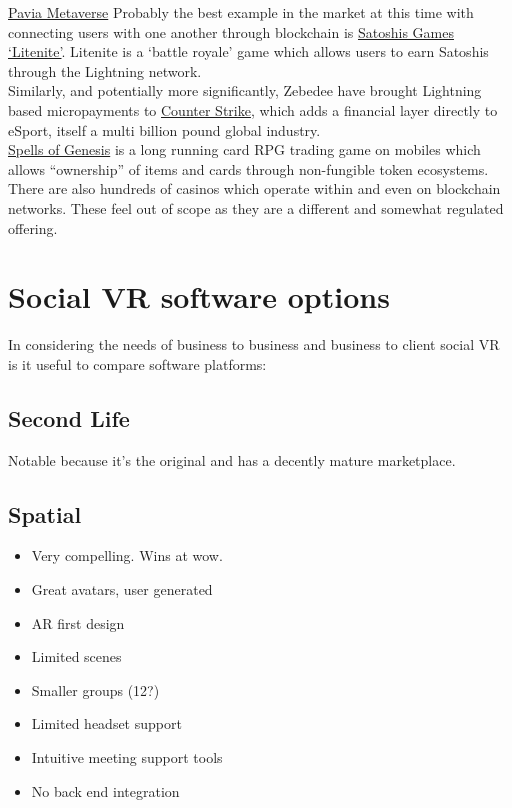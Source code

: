 \href{https://www.thesun.co.uk/tech/17348918/pavia-metaverse-cardano-crypto-game/}{Pavia Metaverse}
Probably the best example in the market at this time with connecting users with one another through blockchain is \href{https://lightnite.io/}{Satoshis Games `Litenite'}. Litenite is a `battle royale' game which allows users to earn Satoshis through the Lightning network.\\
Similarly, and potentially more significantly, Zebedee have brought Lightning based micropayments to \href{https://zebedee.io/infuse/}{Counter Strike}, which adds a financial layer directly to eSport, itself a multi billion pound global industry.\\
\href{https://spellsofgenesis.com/}{Spells of Genesis} is a long running card RPG trading game on mobiles which allows ``ownership'' of items and cards through non-fungible token ecosystems.\\
There are also hundreds of casinos which operate within and even on blockchain networks. These feel out of scope as they are a different and somewhat regulated offering.

\section{Social VR software options}
In considering the needs of business to business and business to client social VR is it useful to compare software platforms:
\subsection{Second Life}
Notable because it's the original and has a decently mature marketplace.
\lipsum[50]
\subsection{Spatial}
\begin{itemize}
\item Very compelling. Wins at wow.
\item Great avatars, user generated
\item AR first design
\item Limited scenes
\item Smaller groups (12?)
\item Limited headset support
\item Intuitive meeting support tools
\item No back end integration
\end{itemize}
